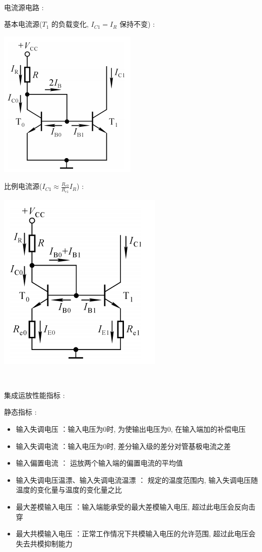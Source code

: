 \documentclass[UTF8, 12pt]{ctexart}
\begin{document}
	~

	\noindent
	电流源电路 :

	基本电流源($ T_{1} $ 的负载变化, $ I_{C1} = I_{R} $ 保持不变) :

	\includegraphics[scale = 0.4]{03/基本电流源电路图.png}

	比例电流源($ I_{C1} \approx \frac{R_{e0}}{R_{e1}}I_{R} $) :

	\includegraphics[scale = 0.4]{03/比例电流源电路图.png}

	~

	\noindent
	集成运放性能指标 :

	静态指标 :
	\begin{itemize}[leftmargin = 4em]
		\item 输入失调电压 ：输入电压为0时,  为使输出电压为0, 在输入端加的补偿电压
		\item 输入失调电流 ：输入电压为0时,  差分输入级的差分对管基极电流之差
		\item 输入偏置电流 ： 运放两个输入端的偏置电流的平均值
		\item 输入失调电压温漂、输入失调电流温漂 ： 规定的温度范围内, 输入失调电压随温度的变化量与温度的变化量之比
		\item 最大差模输入电压 ：输入端能承受的最大差模输入电压,  超过此电压会反向击穿
		\item 最大共模输入电压 ：正常工作情况下共模输入电压的允许范围, 超过此电压会失去共模抑制能力
	\end{itemize}
\end{document}
